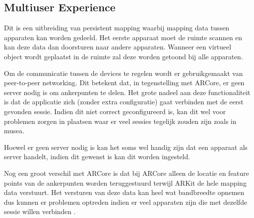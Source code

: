 \subsection{Multiuser Experience}
Dit is een uitbreiding van persistent mapping waarbij mapping data tussen apparaten kan worden gedeeld. Het eerste apparaat moet de ruimte scannen en kan deze data dan doorsturen naar andere apparaten. Wanneer een virtueel object wordt geplaatst in de ruimte zal deze worden getoond bij alle apparaten.

Om de communicatie tussen de devices te regelen wordt er gebruikgemaakt van peer-to-peer networking. Dit betekent dat, in tegenstelling met ARCore, er geen server nodig is om ankerpunten te delen. Het grote nadeel aan deze functionaliteit is dat de applicatie zich (zonder extra configuratie) gaat verbinden met de eerst gevonden sessie. Indien dit niet correct geconfigureerd is, kan dit wel voor problemen zorgen in plaatsen waar er veel sessies tegelijk zouden zijn zoals in musea.

Hoewel er geen server nodig is kan het soms wel handig zijn dat een apparaat als server handelt, indien dit gewenst is kan dit worden ingesteld.

Nog een groot verschil met ARCore is dat bij ARCore alleen de locatie en feature points van de ankerpunten worden teruggestuurd terwijl ARKit de hele mapping data verstuurt. Het versturen van deze data kan heel wat bandbreedte opnemen dus kunnen er problemen optreden indien er veel apparaten zijn die met dezelfde sessie willen verbinden \autocite{ARKitMultiuser}.

